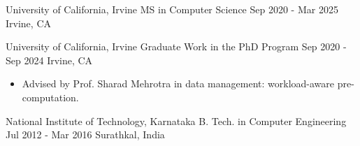 \newcommand{\makework}[6]{
    \expandafter\def\csname work#1\endcsname{#2}
    \expandafter\def\csname title#1\endcsname{#3}
    \expandafter\def\csname time#1\endcsname{#4}
    \expandafter\def\csname place#1\endcsname{#5}
    \expandafter\def\csname detail#1\endcsname{#6}
}


\makework{mscs}
    {University of California, Irvine}
    {MS in Computer Science}
    {Sep 2020 - Mar 2025}
    {Irvine, CA}
    {}

\makework{phd}
    {University of California, Irvine}
    {Graduate Work in the PhD Program}
    {Sep 2020 - Sep 2024}
    {Irvine, CA}
    {
    \begin{itemize}
        \item Advised by Prof. Sharad Mehrotra in data management: workload-aware pre-computation.%
    \end{itemize}
    }

\makework{btech}
    {National Institute of Technology, Karnataka}
    {B. Tech. in Computer Engineering}
    {Jul 2012 - Mar 2016}
    {Surathkal, India}
    {}
